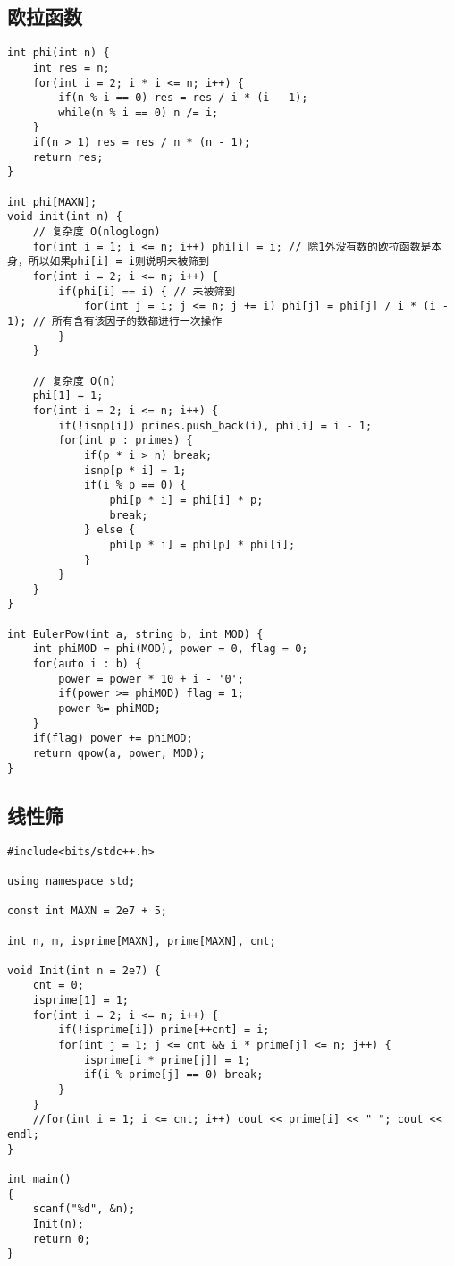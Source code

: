 \subsection{欧拉函数}
\begin{lstlisting}
int phi(int n) {
    int res = n;
    for(int i = 2; i * i <= n; i++) {
        if(n % i == 0) res = res / i * (i - 1);
        while(n % i == 0) n /= i;
    }
    if(n > 1) res = res / n * (n - 1);
    return res;
}

int phi[MAXN];
void init(int n) {
    // 复杂度 O(nloglogn)
    for(int i = 1; i <= n; i++) phi[i] = i; // 除1外没有数的欧拉函数是本身，所以如果phi[i] = i则说明未被筛到
    for(int i = 2; i <= n; i++) {
        if(phi[i] == i) { // 未被筛到
            for(int j = i; j <= n; j += i) phi[j] = phi[j] / i * (i - 1); // 所有含有该因子的数都进行一次操作
        }
    }

    // 复杂度 O(n)
    phi[1] = 1;
    for(int i = 2; i <= n; i++) {
        if(!isnp[i]) primes.push_back(i), phi[i] = i - 1;
        for(int p : primes) {
            if(p * i > n) break;
            isnp[p * i] = 1;
            if(i % p == 0) {
                phi[p * i] = phi[i] * p;
                break;
            } else {
                phi[p * i] = phi[p] * phi[i];
            }
        }
    }
}

int EulerPow(int a, string b, int MOD) {
    int phiMOD = phi(MOD), power = 0, flag = 0;
    for(auto i : b) {
        power = power * 10 + i - '0';
        if(power >= phiMOD) flag = 1;
        power %= phiMOD;
    }
    if(flag) power += phiMOD;
    return qpow(a, power, MOD);
}
\end{lstlisting}

\subsection{线性筛}
\begin{lstlisting}
#include<bits/stdc++.h>

using namespace std;

const int MAXN = 2e7 + 5;

int n, m, isprime[MAXN], prime[MAXN], cnt;

void Init(int n = 2e7) {
	cnt = 0;
	isprime[1] = 1;
	for(int i = 2; i <= n; i++) {
		if(!isprime[i]) prime[++cnt] = i;
		for(int j = 1; j <= cnt && i * prime[j] <= n; j++) {
			isprime[i * prime[j]] = 1;
			if(i % prime[j] == 0) break;
		}
	}
	//for(int i = 1; i <= cnt; i++) cout << prime[i] << " "; cout << endl;
}

int main()
{
	scanf("%d", &n);
	Init(n);
	return 0;
}
\end{lstlisting}

